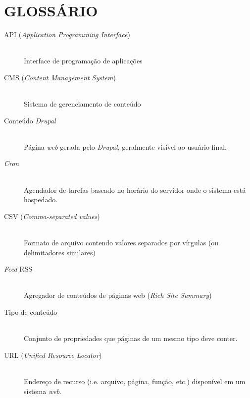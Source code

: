 \documentclass[a4paper]{article}
\begin{document}




\pagebreak
\section{GLOSSÁRIO}
\begin{description}
\item[API (\textit{Application Programming Interface})] \hfill \\ Interface de programação de aplicações
\item[CMS (\textit{Content Management System})] \hfill \\ Sistema de gerenciamento de conteúdo
\item[Conteúdo \textit{Drupal}] \hfill \\ Página \textit{web} gerada pelo \textit{Drupal}, geralmente visível ao usuário final.
\item[\textit{Cron}] \hfill \\ Agendador de tarefas baseado no horário do servidor onde o sistema está hospedado.
\item[CSV (\textit{Comma-separated values})] \hfill \\ Formato de arquivo contendo valores separados por vírgulas (ou delimitadores similares)
\item[\textit{Feed} RSS] \hfill \\ Agregador de conteúdos de páginas web (\textit{Rich Site Summary})
\item[Tipo de conteúdo] \hfill \\ Conjunto de propriedades que páginas de um mesmo tipo deve conter.
\item[URL (\textit{Unified Resource Locator})] \hfill \\ Endereço de recurso (i.e. arquivo, página, função, etc.) disponível em um sistema \textit{web}.
\end{description}
\end{document}
